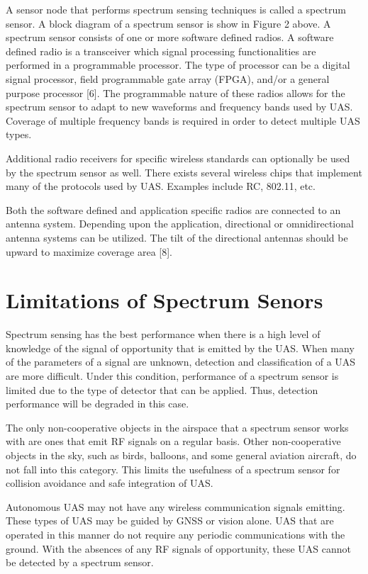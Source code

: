 \documentclass[journal,transmag]{IEEEtran}
\begin{document}
A sensor node that performs spectrum sensing techniques is called a spectrum sensor. A block diagram of a spectrum sensor is show in Figure 2 above.  A spectrum sensor consists of one or more software defined radios. A software defined radio is a transceiver which signal processing functionalities are performed in a programmable processor. The type of processor can be a digital signal processor, field programmable gate array (FPGA), and/or a general purpose processor [6]. The programmable nature of these radios allows for the spectrum sensor to adapt to new waveforms and frequency bands used by UAS. Coverage of multiple frequency bands is required in order to detect multiple UAS types.

Additional radio receivers for specific wireless standards can optionally be used by the spectrum sensor as well. There exists several wireless chips that implement many of the protocols used by UAS. Examples include RC, 802.11, etc. 

Both the software defined and application specific radios are connected to an antenna system. Depending upon the application, directional or omnidirectional antenna systems can be utilized. The tilt of the directional antennas should be upward to maximize coverage area [8]. 

\section{Limitations of Spectrum Senors}

Spectrum sensing has the best performance when there is a high level of knowledge of the signal of opportunity that is emitted by the UAS. When many of the parameters of a signal are unknown, detection and classification of a UAS are more difficult. Under this condition, performance of a spectrum sensor is limited due to the type of detector that can be applied. Thus, detection performance will be degraded in this case.

The only non-cooperative objects in the airspace that a spectrum sensor works with are ones that emit RF signals on a regular basis. Other non-cooperative objects in the sky, such as birds, balloons, and some general aviation aircraft, do not fall into this category. This limits the usefulness of a spectrum sensor for collision avoidance and safe integration of UAS.

Autonomous UAS may not have any wireless communication signals emitting. These types of UAS may be guided by GNSS or vision alone. UAS that are operated in this manner do not require any periodic communications with the ground. With the absences of any RF signals of opportunity, these UAS cannot be detected by a spectrum sensor. 
\end{document}
